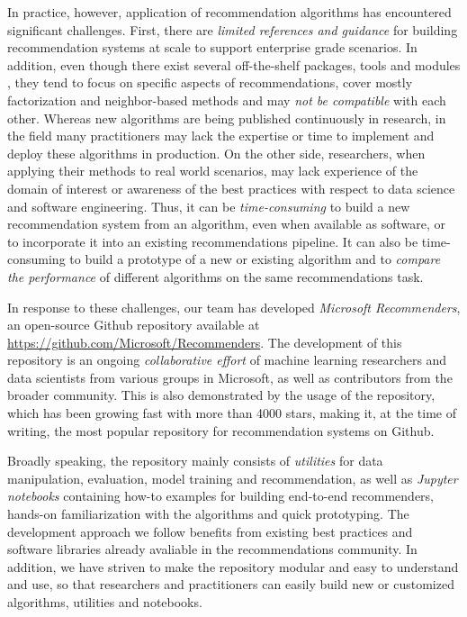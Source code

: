 In practice, however, application of recommendation algorithms has encountered significant challenges. 
First, there are {\em limited references and guidance} for building recommendation systems at scale to support
enterprise grade scenarios. In addition, even though there exist several off-the-shelf packages, tools and 
modules \cite{mymedia,Surprise,spotlight,caserec,lenskit}, 
they tend to focus on specific aspects of recommendations, 
cover mostly factorization and neighbor-based methods 
and may {\em not be compatible} with each other. Whereas new algorithms are being published continuously in research, in the field many practitioners may lack the 
expertise or time to implement and deploy these algorithms in production. 
On the other side, researchers, when applying their methods to real world scenarios, may lack experience of the domain of interest
or awareness of the best practices with respect to data science and software engineering. Thus, it can be {\em time-consuming} to build a new recommendation system from an
algorithm, even when available as software, or to incorporate it into an existing recommendations pipeline. It can also be time-consuming to build a prototype of a new or existing algorithm and to 
{\em compare the performance} of different algorithms on the same recommendations task. 

In response to these challenges, our team has developed {\em Microsoft Recommenders}, an open-source 
Github repository available at \url{https://github.com/Microsoft/Recommenders}.
The development of this repository is an ongoing {\em collaborative effort} of machine learning researchers and data scientists from 
various groups in Microsoft, as well as contributors from the broader community.
This is also demonstrated by the usage of the repository, which has been growing fast 
with more than 4000 stars, making it, 
at the time of writing, the most popular repository for recommendation systems on Github.%

Broadly speaking, the repository mainly consists of {\em utilities} for data manipulation, evaluation, 
model training and recommendation, as well as {\em Jupyter notebooks} containing how-to examples for building end-to-end recommenders, hands-on familiarization with the algorithms and quick prototyping. 
The development approach we follow benefits from existing best practices and software libraries already avaliable in the recommendations community.
In addition, we have striven to make the repository modular and easy to understand and use, so that researchers and practitioners can easily build
new or customized algorithms, utilities and notebooks.


